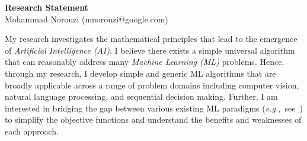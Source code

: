 \documentclass[a4paper, 10pt]{article}
\def\eg{{\em e.g.,}}
\begin{document}
\thispagestyle{fancy}
\lhead{}
\rhead{}
\renewcommand{\headrulewidth}{0pt} 
\renewcommand{\footrulewidth}{0pt} 
\fancyfoot[C]{\footnotesize \textcolor{gray}{https://norouzi.github.io/}} 


\pagestyle{fancy}
\lhead{\textcolor{gray}{\it Mohammad Norouzi}}
\rhead{\textcolor{gray}{\thepage/\totalpages{}}}


\begin{center}
{\LARGE \bf Research Statement}\\
\vspace*{0.1cm}
{\normalsize Mohammad Norouzi (mnorouzi@google.com)}
\vspace*{0.2cm}
\end{center}




My research investigates the mathematical principles that lead to the
emergence of {\em Artificial Intelligence (AI)}.  I believe there
exists a simple universal algorithm that can reasonably address many
{\em Machine Learning (ML)} problems. Hence, through my research, I
develop simple and generic ML algorithms that are broadly applicable
across a range of problem domains including computer vision, natural
language processing, and sequential decision making. Further, I am
interested in bridging the gap between various existing ML paradigms
(\eg~see~\cite{raml,pcl}) to simplify the objective functions and
understand the benefits and weaknesses of each approach.

\end{document}

